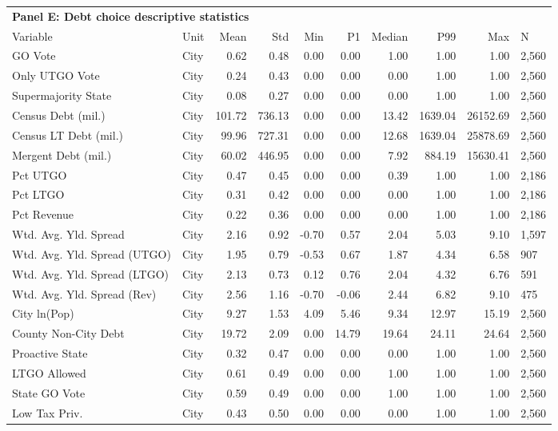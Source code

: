 \begin{table}[H]
\centering
\begin{tabular*}{\textwidth}{@{\extracolsep{\fill}}llrrrrrrrl}
\multicolumn{10}{l}{\textbf{Panel E: Debt choice descriptive statistics}}\\

\addlinespace
  \toprule
Variable & Unit & Mean & Std & Min & P1 & Median & P99 & Max & N \\ 
  \hline
GO Vote & City & 0.62 & 0.48 & 0.00 & 0.00 & 1.00 & 1.00 & 1.00 & 2,560 \\ 
  Only UTGO Vote & City & 0.24 & 0.43 & 0.00 & 0.00 & 0.00 & 1.00 & 1.00 & 2,560 \\ 
  Supermajority State & City & 0.08 & 0.27 & 0.00 & 0.00 & 0.00 & 1.00 & 1.00 & 2,560 \\ 
  Census Debt (mil.) & City & 101.72 & 736.13 & 0.00 & 0.00 & 13.42 & 1639.04 & 26152.69 & 2,560 \\ 
  Census LT Debt (mil.) & City & 99.96 & 727.31 & 0.00 & 0.00 & 12.68 & 1639.04 & 25878.69 & 2,560 \\ 
  Mergent Debt (mil.) & City & 60.02 & 446.95 & 0.00 & 0.00 & 7.92 & 884.19 & 15630.41 & 2,560 \\ 
  Pct UTGO & City & 0.47 & 0.45 & 0.00 & 0.00 & 0.39 & 1.00 & 1.00 & 2,186 \\ 
  Pct LTGO & City & 0.31 & 0.42 & 0.00 & 0.00 & 0.00 & 1.00 & 1.00 & 2,186 \\ 
  Pct Revenue & City & 0.22 & 0.36 & 0.00 & 0.00 & 0.00 & 1.00 & 1.00 & 2,186 \\ 
  Wtd. Avg. Yld. Spread & City & 2.16 & 0.92 & -0.70 & 0.57 & 2.04 & 5.03 & 9.10 & 1,597 \\ 
  Wtd. Avg. Yld. Spread (UTGO) & City & 1.95 & 0.79 & -0.53 & 0.67 & 1.87 & 4.34 & 6.58 &   907 \\ 
  Wtd. Avg. Yld. Spread (LTGO) & City & 2.13 & 0.73 & 0.12 & 0.76 & 2.04 & 4.32 & 6.76 &   591 \\ 
  Wtd. Avg. Yld. Spread (Rev) & City & 2.56 & 1.16 & -0.70 & -0.06 & 2.44 & 6.82 & 9.10 &   475 \\ 
  City ln(Pop) & City & 9.27 & 1.53 & 4.09 & 5.46 & 9.34 & 12.97 & 15.19 & 2,560 \\ 
  County Non-City Debt & City & 19.72 & 2.09 & 0.00 & 14.79 & 19.64 & 24.11 & 24.64 & 2,560 \\ 
  Proactive State & City & 0.32 & 0.47 & 0.00 & 0.00 & 0.00 & 1.00 & 1.00 & 2,560 \\ 
  LTGO Allowed & City & 0.61 & 0.49 & 0.00 & 0.00 & 1.00 & 1.00 & 1.00 & 2,560 \\ 
  State GO Vote & City & 0.59 & 0.49 & 0.00 & 0.00 & 1.00 & 1.00 & 1.00 & 2,560 \\ 
  Low Tax Priv. & City & 0.43 & 0.50 & 0.00 & 0.00 & 0.00 & 1.00 & 1.00 & 2,560 \\ 
   \hline
\end{tabular*}
\end{table}
